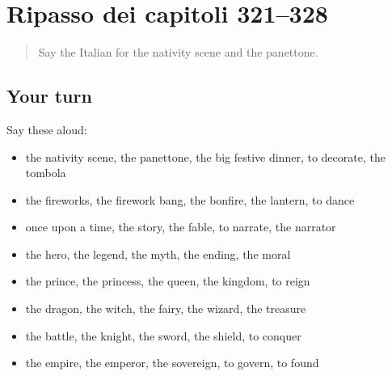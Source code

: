 \section[(dialogue)]{Ripasso dei capitoli 321–328}

\label{lesson:IT-R328-ripasso-321-328}



\begin{quote}
Say the Italian for the nativity scene and the panettone.
\end{quote}

\subsection*{Your turn}
Say these aloud:

\begin{itemize}
\raggedright
  \item the nativity scene, the panettone, the big festive dinner, to decorate, the tombola
  \item the fireworks, the firework bang, the bonfire, the lantern, to dance
  \item once upon a time, the story, the fable, to narrate, the narrator
  \item the hero, the legend, the myth, the ending, the moral
  \item the prince, the princess, the queen, the kingdom, to reign
  \item the dragon, the witch, the fairy, the wizard, the treasure
  \item the battle, the knight, the sword, the shield, to conquer
  \item the empire, the emperor, the sovereign, to govern, to found
\end{itemize}

